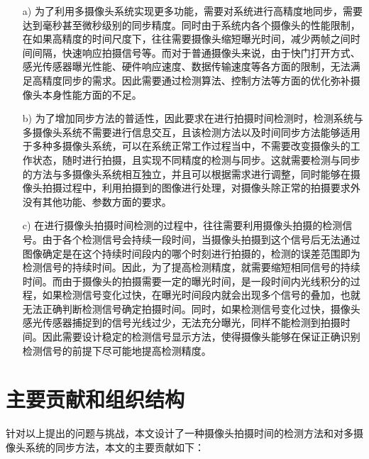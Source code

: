 \begin{itemize}

\item[a)] 为了利用多摄像头系统实现更多功能，需要对系统进行高精度地同步，需要达到毫秒甚至微秒级别的同步精度。同时由于系统内各个摄像头的性能限制，在如果高精度的时间尺度下，往往需要摄像头缩短曝光时间，减少两帧之间时间间隔，快速响应拍摄信号等。而对于普通摄像头来说，由于快门打开方式、感光传感器曝光性能、硬件响应速度、数据传输速度等各方面的限制，无法满足高精度同步的需求。因此需要通过检测算法、控制方法等方面的优化弥补摄像头本身性能方面的不足。

\item[b)]为了增加同步方法的普适性，因此要求在进行拍摄时间检测时，检测系统与多摄像头系统不需要进行信息交互，且该检测方法以及时间同步方法能够适用于多种多摄像头系统，可以在系统正常工作过程当中，不需要改变摄像头的工作状态，随时进行拍摄，且实现不同精度的检测与同步。这就需要检测与同步的方法与多摄像头系统相互独立，并且可以根据需求进行调整，同时能够在摄像头拍摄过程中，利用拍摄到的图像进行处理，对摄像头除正常的拍摄要求外没有其他功能、参数方面的要求。

\item[c)]在进行摄像头拍摄时间检测的过程中，往往需要利用摄像头拍摄的检测信号。由于各个检测信号会持续一段时间，当摄像头拍摄到这个信号后无法通过图像确定是在这个持续时间段内的哪个时刻进行拍摄的，检测的误差范围即为检测信号的持续时间。因此，为了提高检测精度，就需要缩短相同信号的持续时间。而由于摄像头的拍摄需要一定的曝光时间，是一段时间内光线积分的过程，如果检测信号变化过快，在曝光时间段内就会出现多个信号的叠加，也就无法正确判断检测信号确定拍摄时间。同时，如果检测信号变化过快，摄像头感光传感器捕捉到的信号光线过少，无法充分曝光，同样不能检测到拍摄时间。因此需要设计稳定的检测信号显示方法，使得摄像头能够在保证正确识别检测信号的前提下尽可能地提高检测精度。

\end{itemize}

\section{主要贡献和组织结构}

针对以上提出的问题与挑战，本文设计了一种摄像头拍摄时间的检测方法和对多摄像头系统的同步方法，本文的主要贡献如下：

